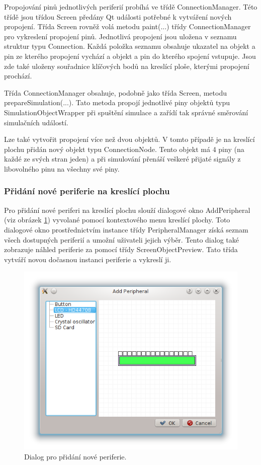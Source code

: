 Propojování pinů jednotlivých periferií probíhá ve třídě ConnectionManager. Této třídě jsou třídou Screen předány Qt události potřebné k vytváření nových propojení. Třída Screen rovněž volá metodu paint(...) třídy ConnectionManager pro vykreslení propojení pinů. Jednotlivá propojení jsou uložena v seznamu struktur typu Connection. Každá položka seznamu obsahuje ukazatel na objekt a pin ze kterého propojení vychází a objekt a pin do kterého spojení vstupuje. Jsou zde také uloženy souřadnice klíčových bodů na kreslící ploše, kterými propojení prochází.

Třída ConnectionManager obsahuje, podobně jako třída Screen, metodu prepareSimulation(...). Tato metoda propojí jednotlivé piny objektů typu SimulationObjectWrapper při spuštění simulace a zařídí tak správné směrování simulačních událostí.

Lze také vytvořit propojení více než dvou objektů. V tomto případě je na kreslící plochu přidán nový objekt typu ConnectionNode. Tento objekt má 4 piny (na každé ze svých stran jeden) a při simulování přenáší veškeré přijaté signály z libovolného pinu na všechny své piny.

\subsubsection{Přidání nové periferie na kreslící plochu}

Pro přidání nové periferi na kreslící plochu slouží dialogové okno AddPeripheral (viz obrázek \ref{fig:addperipheral}) vyvolané pomocí kontextového menu kreslící plochy. Toto dialogové okno prostřednictvím instance třídy PeripheralManager získá seznam všech dostupných periferií a umožní uživateli jejich výběr. Tento dialog také zobrazuje náhled periferie za pomocí třídy ScreenObjectPreview. Tato třída vytváří novou dočasnou instanci periferie a vykreslí ji.

\begin{figure}[ht]
\centering
\includegraphics[trim=0cm 0cm 0cm 0cm]{fig/addperipheral}
\caption{Dialog pro přidání nové periferie.}
\label{fig:addperipheral}
\end{figure}

